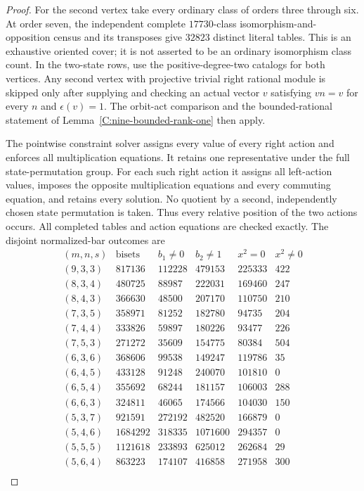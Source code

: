 \begin{proof}
For the second vertex take every ordinary class of orders
three through six.  At order seven, the independent complete
$17730$-class isomorphism-and-opposition census and its transposes
give $32823$ distinct literal tables.  This is an exhaustive
oriented cover; it is not asserted to be an ordinary isomorphism
class count.  In the two-state rows, use the positive-degree-two
catalogs for both vertices.  Any second vertex with projective
trivial right rational module is skipped only after supplying
and checking an actual vector $v$ satisfying
$vn=v$ for every $n$ and $\epsilon(v)=1$.
The orbit-act comparison and the bounded-rational statement of
Lemma~\ref{C:nine-bounded-rank-one} then apply.

The pointwise constraint solver assigns every value of every
right action and enforces all multiplication equations.  It
retains one representative under the full state-permutation
group.  For each such right action it assigns all left-action
values, imposes the opposite multiplication equations and every
commuting equation, and retains every solution.  No quotient by
a second, independently chosen state permutation is taken.
Thus every relative position of the two actions occurs.
All completed tables and action equations are checked exactly.
The disjoint normalized-bar outcomes are
\[
\begin{array}{c|r|r|r|r|r}
(m,n,s)&\text{bisets}&b_1\ne0&b_2\ne1&x^2=0&x^2\ne0\\\hline
(9,3,3)&817136&112228&479153&225333&422\\
(8,3,4)&480725&88987&222031&169460&247\\
(8,4,3)&366630&48500&207170&110750&210\\
(7,3,5)&358971&81252&182780&94735&204\\
(7,4,4)&333826&59897&180226&93477&226\\
(7,5,3)&271272&35609&154775&80384&504\\
(6,3,6)&368606&99538&149247&119786&35\\
(6,4,5)&433128&91248&240070&101810&0\\
(6,5,4)&355692&68244&181157&106003&288\\
(6,6,3)&324811&46065&174566&104030&150\\
(5,3,7)&921591&272192&482520&166879&0\\
(5,4,6)&1684292&318335&1071600&294357&0\\
(5,5,5)&1121618&233893&625012&262684&29\\
(5,6,4)&863223&174107&416858&271958&300\\

\end{array}\]
\end{proof}
